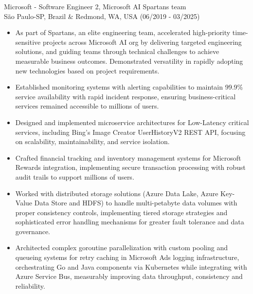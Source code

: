 
\normalsize{Microsoft - Software Engineer 2, Microsoft AI Spartans team}\\
        \scriptsize{São Paulo-SP, Brazil \& Redmond, WA, USA (06/2019 - 03/2025)}
\begin{itemize}
    \item \scriptsize{As part of Spartans, an elite engineering team, accelerated high-priority time-sensitive
        projects across Microsoft AI org by delivering targeted engineering solutions, and guiding teams through
        technical challenges to achieve measurable business outcomes. Demonstrated versatility in rapidly adopting
        new technologies based on project requirements.}

    \item \scriptsize{Established monitoring systems with alerting capabilities to maintain 99.9\% service
        availability with rapid incident response, ensuring business-critical services remained accessible to
        millions of users.}

    \item \scriptsize{Designed and implemented microservice architectures for Low-Latency critical services,
        including Bing's Image Creator UserHistoryV2 REST API, focusing on scalability, maintainability, and
        service isolation.}

    \item \scriptsize{Crafted financial tracking and inventory management systems for Microsoft Rewards
        integration, implementing secure transaction processing with robust audit trails to support millions of users.}

    \item \scriptsize{Worked with distributed storage solutions (Azure Data Lake, Azure Key-Value Data Store and
        HDFS) to handle multi-petabyte data volumes with proper consistency controls, implementing tiered storage
        strategies and sophisticated error handling mechanisms for greater fault tolerance and data governance.}

    \item \scriptsize{Architected complex goroutine parallelization with custom pooling and queueing systems
        for retry caching in Microsoft Ads logging infrastructure, orchestrating Go and Java components via
        Kubernetes while integrating with Azure Service Bus, measurably improving data throughput, consistency
        and reliability.}


\end{itemize}
